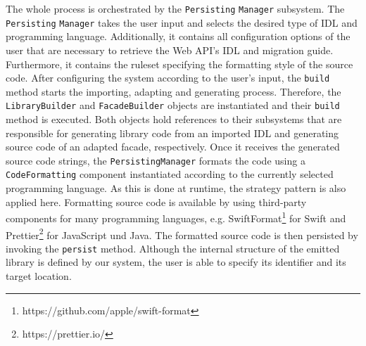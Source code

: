 \begin{figure}[!h]
\end{figure}

The whole process is orchestrated by the \texttt{Persisting} \texttt{Manager} subsystem. The \texttt{Persisting} \texttt{Manager} takes the user input and selects the desired type of \ac{IDL} and programming language. Additionally, it contains all configuration options of the user that are necessary to retrieve the Web API's \ac{IDL} and migration guide. Furthermore, it contains the ruleset specifying the formatting style of the source code. After configuring the system according to the user's input, the \texttt{build} method starts the importing, adapting and generating process. Therefore, the \texttt{LibraryBuilder} and \texttt{FacadeBuilder} objects are instantiated and their \texttt{build} method is executed. Both objects hold references to their subsystems that are responsible for generating library code from an imported \ac{IDL} and generating source code of an adapted facade, respectively. Once it receives the generated source code strings, the \texttt{PersistingManager} formats the code using a \texttt{Code\-For\-mat\-ting} component instantiated according to the currently selected programming language. As this is done at runtime, the strategy pattern is also applied here. Formatting source code is available by using third-party components for many programming languages, e.g. SwiftFormat\footnote{https://github.com/apple/swift-format} for Swift and Prettier\footnote{https://prettier.io/} for JavaScript und Java. The formatted source code is then persisted by invoking the \texttt{persist} method. Although the internal structure of the emitted library is defined by our system, the user is able to specify its identifier and its target location.